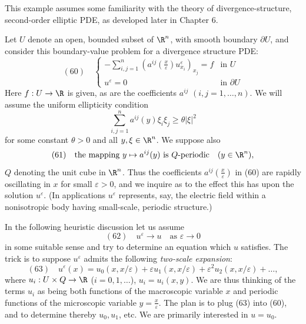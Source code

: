 \begin{example}
\label{ex:periodic-homogenization-elliptic}
This example assumes some familiarity with the theory of divergence-structure, second-order elliptic PDE, as developed later in Chapter 6.

Let $U$ denote an open, bounded subset of $\R^n$, with smooth boundary $\partial U$, and consider this boundary-value problem for a divergence structure PDE:
$$(60) \quad \begin{cases}
-\sum_{i,j=1}^{n} (a^{ij}(\frac{x}{\varepsilon}) u^\varepsilon_{x_i})_{x_j} = f & \text{in } U \\
u^\varepsilon = 0 & \text{in } \partial U
\end{cases}$$
Here $f : U \to \R$ is given, as are the coefficients $a^{ij}$ $(i, j = 1, \ldots, n)$. We will assume the uniform ellipticity condition
$$\sum_{i,j=1}^{n} a^{ij}(y)\xi_i\xi_j \geq \theta|\xi|^2$$
for some constant $\theta > 0$ and all $y, \xi \in \R^n$. We suppose also
$$(61) \quad \text{the mapping } y \mapsto a^{ij}(y) \text{ is } Q\text{-periodic} \quad (y \in \R^n),$$
$Q$ denoting the unit cube in $\R^n$. Thus the coefficients $a^{ij}(\frac{x}{\varepsilon})$ in (60) are rapidly oscillating in $x$ for small $\varepsilon > 0$, and we inquire as to the effect this has upon the solution $u^\varepsilon$. (In applications $u^\varepsilon$ represents, say, the electric field within a nonisotropic body having small-scale, periodic structure.)

In the following heuristic discussion let us assume
$$(62) \quad u^\varepsilon \to u \quad \text{as } \varepsilon \to 0$$
in some suitable sense and try to determine an equation which $u$ satisfies. The trick is to suppose $u^\varepsilon$ admits the following \textit{two-scale expansion}:
$$(63) \quad u^\varepsilon(x) = u_0(x, x/\varepsilon) + \varepsilon u_1(x, x/\varepsilon) + \varepsilon^2 u_2(x, x/\varepsilon) + \ldots,$$
where $u_i: U \times Q \to \R$ ($i = 0, 1, \ldots$), $u_i = u_i(x, y)$. We are thus thinking of the terms $u_i$ as being both functions of the macroscopic variable $x$ and periodic functions of the microscopic variable $y = \frac{x}{\varepsilon}$. The plan is to plug (63) into (60), and to determine thereby $u_0, u_1$, etc. We are primarily interested in $u = u_0$.


\end{example}
